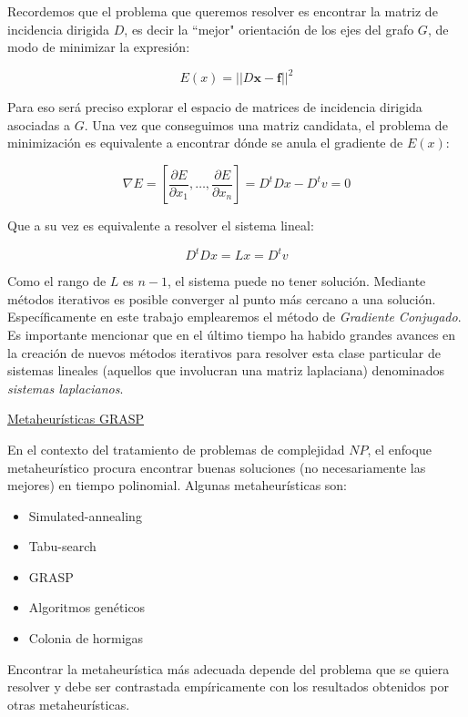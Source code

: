 \documentclass[a4paper,11pt]{article}
\begin{document}
Recordemos que el problema que queremos resolver es encontrar la matriz 
de incidencia dirigida $D$, es decir la ``mejor" orientación de los ejes 
del grafo $G$, de modo de minimizar la expresión:

$$E(x) = ||D\bm{x}-\bm{f}||^2$$

Para eso será preciso explorar el espacio de matrices de 
incidencia dirigida asociadas a $G$. Una vez que conseguimos una 
matriz candidata, el problema de minimización es equivalente a encontrar
dónde se anula el gradiente de $E(x)$:
 
$$\nabla E = [\frac{\partial E}{\partial x_1}, \dots, \frac{\partial 
E}{\partial x_n}] = D^tDx-D^tv=0$$

Que a su vez es equivalente a resolver el sistema lineal:

$$D^tDx = Lx = D^tv$$

Como el rango de $L$ es $n-1$, el sistema puede no tener solución. 
Mediante métodos iterativos es posible converger al punto más cercano a 
una solución. Específicamente en este trabajo emplearemos el método de 
\textit{Gradiente Conjugado}. Es importante mencionar que en el último 
tiempo ha habido grandes avances en la creación de nuevos métodos 
iterativos para resolver esta clase particular de sistemas lineales 
(aquellos que involucran una matriz laplaciana) denominados 
\textit{sistemas laplacianos}.

\bigskip

\underline{Metaheurísticas GRASP}

\bigskip

En el contexto del tratamiento de problemas de complejidad $NP$, el 
enfoque metaheurístico procura encontrar buenas soluciones (no 
necesariamente las mejores) en tiempo polinomial. Algunas 
metaheurísticas son:

\begin{itemize}
	\item Simulated-annealing
	\item Tabu-search
	\item GRASP
	\item Algoritmos genéticos
	\item Colonia de hormigas
\end{itemize}

Encontrar la metaheurística más adecuada depende del problema que se 
quiera resolver y debe ser contrastada empíricamente con los resultados 
obtenidos por otras metaheurísticas.

\bigskip
\end{document}
